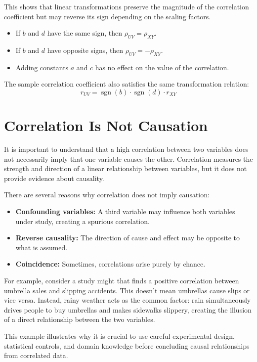 \documentclass[twoside]{book}
\begin{document}
This shows that linear transformations preserve the magnitude of the correlation coefficient but may reverse its sign depending on the scaling factors.
\begin{itemize}
	\item If \(b\) and \(d\) have the same sign, then \(\rho_{UV} = \rho_{XY}\).
	\item If \(b\) and \(d\) have opposite signs, then \(\rho_{UV} = -\rho_{XY}\).
	\item Adding constants \(a\) and \(c\) has no effect on the value of the correlation.
\end{itemize}

The sample correlation coefficient also satisfies the same transformation relation:
\[
r_{UV} = \operatorname{sgn}(b) \cdot \operatorname{sgn}(d) \cdot r_{XY}
\]


\section{Correlation Is Not Causation}

It is important to understand that a high correlation between two variables does not necessarily imply that one variable causes the other. Correlation measures the strength and direction of a linear relationship between variables, but it does not provide evidence about causality.

There are several reasons why correlation does not imply causation:

\begin{itemize}
	\item \textbf{Confounding variables:} A third variable may influence both variables under study, creating a spurious correlation.
	\item \textbf{Reverse causality:} The direction of cause and effect may be opposite to what is assumed.
	\item \textbf{Coincidence:} Sometimes, correlations arise purely by chance.
\end{itemize}

For example, consider a study might that finds a positive correlation between umbrella sales and slipping accidents. This doesn't mean umbrellas cause slips or vice versa. Instead, rainy weather acts as the common factor: rain simultaneously drives people to buy umbrellas and makes sidewalks slippery, creating the illusion of a direct relationship between the two variables.

This example illustrates why it is crucial to use careful experimental design, statistical controls, and domain knowledge before concluding causal relationships from correlated data.
\end{document}
